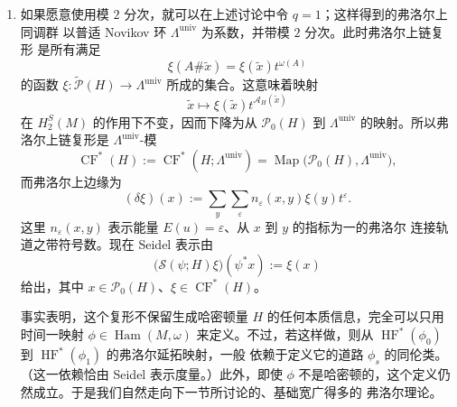 \begin{remark}
\begin{enumerate}[label=(\roman*)]
\item 如果愿意使用模 $2$ 分次，就可以在上述讨论中令 $q=1$；这样得到的弗洛尔上同调群
以普适 Novikov 环 $\Lambda^{\mathrm{univ}}$ 为系数，并带模 $2$ 分次。此时弗洛尔上链复形
是所有满足
\[
  \xi(A\#\widetilde x)=\xi(\widetilde x)t^{\omega(A)}
\]
的函数 $\xi:\widetilde{\mathcal P}(H)\to\Lambda^{\mathrm{univ}}$ 所成的集合。这意味着映射
\[
  \widetilde x\longmapsto
  \xi(\widetilde x)t^{\mathcal A_H(\widetilde x)}
\]
在 $H_2^S(M)$ 的作用下不变，因而下降为从 $\mathcal P_0(H)$ 到
$\Lambda^{\mathrm{univ}}$ 的映射。所以弗洛尔上链复形是 $\Lambda^{\mathrm{univ}}$-模
\[
  \operatorname{CF}^*(H):=
  \operatorname{CF}^*(H;\Lambda^{\mathrm{univ}})
  =\operatorname{Map}\bigl(\mathcal P_0(H),\Lambda^{\mathrm{univ}}\bigr),
\]
而弗洛尔上边缘为
\[
  (\delta\xi)(x):=
  \sum_y\sum_\varepsilon n_\varepsilon(x,y)\xi(y)t^\varepsilon.
\]
这里 $n_\varepsilon(x,y)$ 表示能量 $E(u)=\varepsilon$、从 $x$ 到 $y$ 的指标为一的弗洛尔
连接轨道之带符号数。现在 Seidel 表示由
\[
  \bigl(\mathcal S(\psi;H)\xi\bigr)(\psi^*x):=\xi(x)
\]
给出，其中 $x\in\mathcal P_0(H)$、$\xi\in\operatorname{CF}^*(H)$。

事实表明，这个复形不保留生成哈密顿量 $H$ 的任何本质信息，完全可以只用时间一映射
$\phi\in\operatorname{Ham}(M,\omega)$ 来定义。不过，若这样做，则从
$\operatorname{HF}^*(\phi_0)$ 到 $\operatorname{HF}^*(\phi_1)$ 的弗洛尔延拓映射，一般
依赖于定义它的道路 $\phi_s$ 的同伦类。（这一依赖恰由 Seidel 表示度量。）此外，即使
$\phi$ 不是哈密顿的，这个定义仍然成立。于是我们自然走向下一节所讨论的、基础宽广得多的
弗洛尔理论。
\end{enumerate}
\end{remark}
